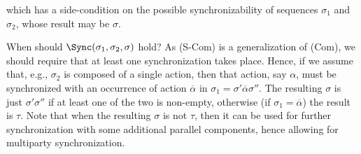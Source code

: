 \noindent
which has a side-condition on the possible synchronizability of sequences $\sigma_1$ and $\sigma_2$,
whose result may be $\sigma$.

When should $\Sync(\sigma_1, \sigma_2, \sigma)$ hold? As (S-Com) is a generalization of (Com), 
we should require that at least one synchronization takes place. Hence, if we assume
that, e.g., $ \sigma_2$ is composed of a single action, then that action, say $\alpha$, must be synchronized
with an occurrence of action $\overline{\alpha}$ in $\sigma_1 = \sigma' \overline{\alpha} \sigma''$.
The resulting $\sigma$ is just $\sigma' \sigma''$ 
if at least one of the two is non-empty, otherwise
(if $\sigma_1 = \overline{\alpha}$) the result is $\tau$. Note that when the resulting $\sigma$ is not $\tau$,
then it can be used for further synchronization with some additional parallel components, hence allowing for
multiparty synchronization.

